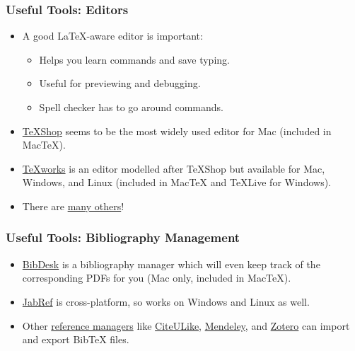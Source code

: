 \begin{frame}
\frametitle{Useful Tools: Editors}

\begin{itemize}
\item A good \LaTeX-aware editor is important:
\begin{itemize}
\item Helps you learn commands and save typing.
\item Useful for previewing and debugging.
\item Spell checker has to go around commands.
\end{itemize}
\item \href{http://pages.uoregon.edu/koch/texshop/texshop.html}{TeXShop}
 seems to be the most widely used editor for Mac (included in MacTeX).
\item \href{http://www.tug.org/texworks/}{TeXworks} is an editor 
modelled after TeXShop but available for Mac, Windows, and Linux 
(included in MacTeX and TeXLive for Windows).
\item There are
  \href{http://en.wikipedia.org/wiki/Comparison_of_TeX_editors}{many
    others}!
\end{itemize}

\end{frame}

\begin{frame}
\frametitle{Useful Tools: Bibliography Management}

\begin{itemize}
\item \href{http://bibdesk.sourceforge.net/}{BibDesk} is a
  bibliography manager which will even keep track of the corresponding
  PDFs for you (Mac only, included in MacTeX).
\item \href{http://jabref.sourceforge.net/}{JabRef} is cross-platform,
  so works on Windows and Linux as well.
\item Other
  \href{http://en.wikipedia.org/wiki/Comparison_of_reference_management_software}{reference
    managers} like \href{http://www.citeulike.org/}{CiteULike},
  \href{http://www.mendeley.com/}{Mendeley}, and
  \href{http://www.zotero.org/}{Zotero} can import and export
  Bib\TeX{} files.
\end{itemize}

\end{frame}

